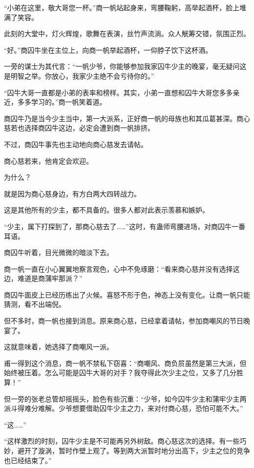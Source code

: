 
\begin{this_body}

“小弟在这里，敬大哥您一杯。”商一帆站起身来，弯腰鞠躬，高举起酒杯，脸上堆满了笑容。

此刻的大堂中，灯火辉煌，歌舞在表演，丝竹声流淌。众人觥筹交错，氛围正烈。

“好。”商囚牛坐在主位上，向商一帆举起酒杯，一仰脖子饮下这杯酒。

一旁的谋士为其代言：“一帆少爷，你能够参加我家囚牛少主的晚宴，毫无疑问这是明智之举。你放心，我家少主绝不会亏待你的。”

“囚牛大哥一直都是小弟的表率和榜样。其实，小弟一直想和囚牛大哥您多多亲近，多多学习的。”商一帆笑着道。

商囚牛乃是当今少主当中，第一大派系，正好商一帆的母族也和其瓜葛甚深。商心慈若也选择商囚牛这边，必定会遭到商一帆排挤。

不过，商囚牛事先也主动地向商心慈发去请帖。

商心慈若来，他肯定会欢迎。

为什么？

就是因为商心慈身边，有方白两大四转战力。

这是其他所有的少主，都不具备的。很多人都对此表示羡慕和嫉妒。

“少主，属下打探到了，那商心慈去了……”这时，有蛊师弯腰进场，对商囚牛一番耳语。

商囚牛听着，目光微微的暗淡下去。

商一帆一直在小心翼翼地察言观色，心中不免琢磨：“看来商心慈并没有选择这边，难道是商蒲牢那派？”

商囚牛面皮上已经历练出了火候。喜怒不形于色，神态上没有变化。让商一帆只能猜测，看不出端倪。

但不多时，商一帆也接到消息。原来商心慈，已经拿着请帖，参加商嘲风的节日晚宴了。

这就意味着，她选择了商嘲风一派。

甫一得到这个消息，商一帆不禁私下窃喜：“商嘲风、商负屃虽然是第三大派，但始终被压着。怎么可能是囚牛大哥的对手？我夺得此次少主之位，又多了几分胜算！”

但一旁的张老总管却摇摇头，脸色有些沉重：“少爷，如今囚牛少主和蒲牢少主两派斗得难分难解。少爷想要借助囚牛少主之力，来对付商心慈，恐怕可能不大。”

“这……”

“这样激烈的时刻，囚牛少主是不可能再另外树敌。商心慈这次的选择。有一些巧妙，避开了漩涡，暂时作壁上观了。等到两大派暂时地分出高下，少主之位的竞争也已经结束了。”


\end{this_body}
